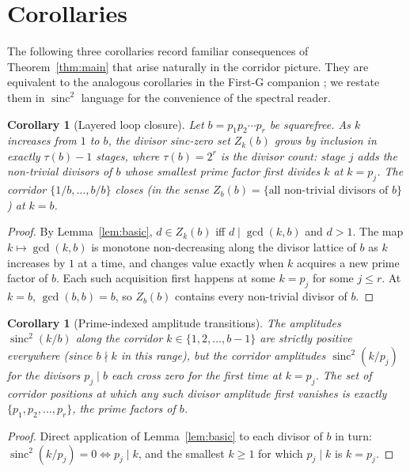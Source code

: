 \documentclass[11pt,reqno]{amsart}
\theoremstyle{plain}
\newtheorem{corollary}[theorem]{Corollary}
\theoremstyle{remark}
\DeclareMathOperator{\sinc}{sinc}
\begin{document}
\section{Corollaries}\label{sec:cor}

The following three corollaries record familiar consequences of
Theorem~\ref{thm:main} that arise naturally in the corridor
picture. They are equivalent to the analogous corollaries in the
First-G companion \cite{J04}; we restate them in $\sinc^2$ language
for the convenience of the spectral reader.

\begin{corollary}[Layered loop closure]\label{cor:loop}
Let $b = p_1 p_2 \cdots p_r$ be squarefree. As $k$ increases from
$1$ to $b$, the divisor sinc-zero set $Z_k(b)$ grows by inclusion in
exactly $\tau(b) - 1$ stages, where $\tau(b) = 2^r$ is the divisor
count: stage $j$ adds the non-trivial divisors of $b$ whose smallest
prime factor first divides $k$ at $k = p_{j}$. The corridor
$\{1/b, \ldots, b/b\}$ closes (in the sense $Z_b(b) = \{
\text{all non-trivial divisors of } b\}$) at $k = b$.
\end{corollary}

\begin{proof}
By Lemma~\ref{lem:basic}, $d \in Z_k(b)$ iff $d \mid \gcd(k, b)$ and
$d > 1$. The map $k \mapsto \gcd(k, b)$ is monotone non-decreasing
along the divisor lattice of $b$ as $k$ increases by $1$ at a time,
and changes value exactly when $k$ acquires a new prime factor of
$b$. Each such acquisition first happens at some $k = p_j$ for some
$j \le r$. At $k = b$, $\gcd(b, b) = b$, so $Z_b(b)$ contains every
non-trivial divisor of $b$.
\end{proof}

\begin{corollary}[Prime-indexed amplitude transitions]
\label{cor:prime-indexed}
The amplitudes $\sinc^2(k/b)$ along the corridor
$k \in \{1, 2, \ldots, b-1\}$ are strictly positive
\emph{everywhere} (since $b \nmid k$ in this range), but the
corridor amplitudes $\sinc^2(k/p_j)$ for the divisors
$p_j \mid b$ each cross zero for the first time at $k = p_j$.
The set of corridor positions at which any such divisor amplitude
first vanishes is exactly $\{p_1, p_2, \ldots, p_r\}$, the prime
factors of $b$.
\end{corollary}

\begin{proof}
Direct application of Lemma~\ref{lem:basic} to each divisor of $b$
in turn: $\sinc^2(k/p_j) = 0 \iff p_j \mid k$, and the smallest
$k \ge 1$ for which $p_j \mid k$ is $k = p_j$.
\end{proof}
\end{document}
